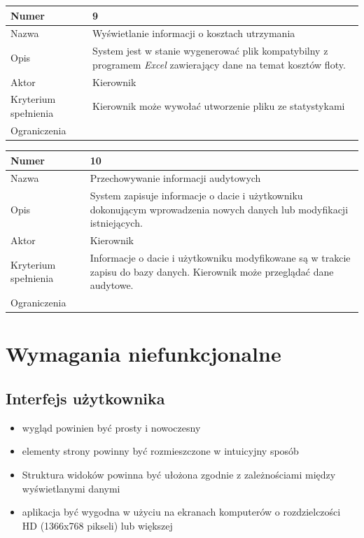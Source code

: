 \documentclass[eng,printmode,openany]{mgr}
\begin{document}
	\begin{table}[H]
		\begin{tabularx}{\textwidth}{|l|X|}
			\hline
			Numer                & 9 \\ \hline
			Nazwa                & Wyświetlanie informacji o kosztach utrzymania \\ \hline
			Opis                 & System jest w stanie wygenerować plik kompatybilny z programem \textit{Excel} zawierający dane na temat kosztów floty. \\ \hline
			Aktor                & Kierownik \\ \hline
			Kryterium spełnienia & Kierownik może wywołać utworzenie pliku ze statystykami  \\ \hline
			Ograniczenia         & \\ \hline
		\end{tabularx}
	\end{table}
	
	\begin{table}[H]
		\begin{tabularx}{\textwidth}{|l|X|}
			\hline
			Numer                & 10 \\ \hline
			Nazwa                & Przechowywanie informacji audytowych \\ \hline
			Opis                 & System zapisuje informacje o dacie i użytkowniku dokonującym wprowadzenia nowych danych lub modyfikacji istniejących. \\ \hline
			Aktor                & Kierownik \\ \hline
			Kryterium spełnienia & Informacje o dacie i użytkowniku modyfikowane są w trakcie zapisu do bazy danych. Kierownik może przeglądać dane audytowe.  \\ \hline
			Ograniczenia         & \\ \hline
		\end{tabularx}
	\end{table}
	
	\section{Wymagania niefunkcjonalne}
	\subsection{Interfejs użytkownika}
	\begin{itemize}
		\item wygląd powinien być prosty i nowoczesny
		\item elementy strony powinny być rozmieszczone w intuicyjny sposób
		\item Struktura widoków powinna być ułożona zgodnie z zależnościami między wyświetlanymi danymi
		\item aplikacja być wygodna w użyciu na ekranach komputerów o rozdzielczości HD (1366x768 pikseli) lub większej
	\end{itemize}
\end{document}

